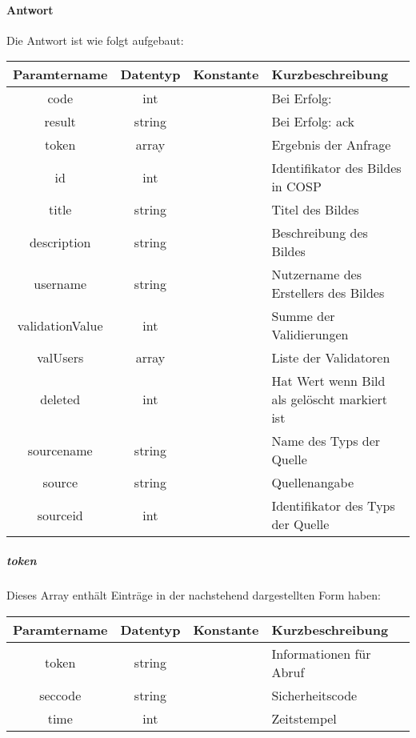 \paragraph{Antwort}Die Antwort ist wie folgt aufgebaut:
\begin{table}[H]
	\begin{tabular}{|c|c|c|p{6.5cm}|}
		\hline
		\textbf{Paramtername} & \textbf{Datentyp} & \textbf{Konstante} & \textbf{Kurzbeschreibung}            \\ \hline                
		code                & int              &                 & Bei Erfolg: {\glqq 0\grqq} \\ \hline
		result              & string           &                 & Bei Erfolg: {\glqq ack\grqq} \\ \hline
		token               & array            &                 & Ergebnis der Anfrage \\ \hline
		id                  & int              &                 & Identifikator des Bildes in {\glqq COSP\grqq} \\ \hline
		title               & string           &                 & Titel des Bildes \\ \hline
		description         & string           &                 & Beschreibung des Bildes \\ \hline
		username            & string           &                 & Nutzername des Erstellers des Bildes\\ \hline
		validationValue     & int              &                 & Summe der Validierungen \\ \hline
		valUsers            & array            &                 & Liste der Validatoren \\ \hline
		deleted             & int              &                 & Hat Wert {\glqq 1\grqq} wenn Bild als gelöscht markiert ist \\ \hline
		sourcename          & string           &                 & Name des Typs der Quelle \\ \hline
		source              & string           &                 & Quellenangabe \\ \hline
		sourceid            & int              &                 & Identifikator des Typs der Quelle \\ \hline
	\end{tabular}
\end{table}
\subparagraph{token}Dieses Array enthält Einträge in der nachstehend dargestellten Form haben:
\begin{table}[H]
	\begin{tabular}{|c|c|c|p{6.5cm}|}
		\hline
		\textbf{Paramtername} & \textbf{Datentyp} & \textbf{Konstante} & \textbf{Kurzbeschreibung}    \\ \hline
		token              & string            &                 & Informationen für Abruf \\ \hline
		seccode            & string            &                 & Sicherheitscode \\ \hline
		time               & int               &                 & Zeitstempel \\ \hline
	\end{tabular}
\end{table}
